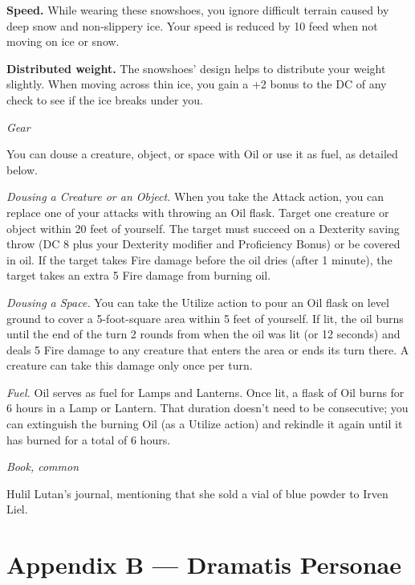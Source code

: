 \documentclass[
  letterpaper,12pt,twoside,twocolumn,openany,
  nodeprecatedcode,bg=full]{dndbook}
\begin{document}
\textbf{Speed.} While wearing these snowshoes, you ignore difficult
terrain caused by deep snow and non-slippery ice. Your speed is reduced
by 10 feed when not moving on ice or snow.

\textbf{Distributed weight.} The snowshoes' design helps to distribute
your weight slightly. When moving across thin ice, you gain a +2 bonus
to the DC of any check to see if the ice breaks under you.

{\emph{Gear}}

You can douse a creature, object, or space with Oil or use it as fuel,
as detailed below.

\emph{Dousing a Creature or an Object.} When you take the Attack action,
you can replace one of your attacks with throwing an Oil flask. Target
one creature or object within 20 feet of yourself. The target must
succeed on a Dexterity saving throw (DC 8 plus your Dexterity modifier
and Proficiency Bonus) or be covered in oil. If the target takes Fire
damage before the oil dries (after 1 minute), the target takes an extra
5 Fire damage from burning oil.

\emph{Dousing a Space.} You can take the Utilize action to pour an Oil
flask on level ground to cover a 5-foot-square area within 5 feet of
yourself. If lit, the oil burns until the end of the turn 2 rounds from
when the oil was lit (or 12 seconds) and deals 5 Fire damage to any
creature that enters the area or ends its turn there. A creature can
take this damage only once per turn.

\emph{Fuel.} Oil serves as fuel for Lamps and Lanterns. Once lit, a
flask of Oil burns for 6 hours in a Lamp or Lantern. That duration
doesn't need to be consecutive; you can extinguish the burning Oil (as a
Utilize action) and rekindle it again until it has burned for a total of
6 hours.

{\emph{Book, common}}

Hulil Lutan's journal, mentioning that she sold a vial of blue powder to
Irven Liel.

\chapter{Appendix B --- Dramatis
Personae}\label{appendix-b-dramatis-personae}
\end{document}
